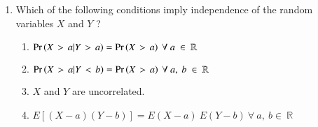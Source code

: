 \begin{enumerate}[label=\thesection.\arabic*.,ref=\thesection.\theenumi]
\item Which of the following conditions imply independence of the random variables $X$
and $Y$ ?
\begin{enumerate}
    \item  $\pr{X\ \mathop{>}\ a|Y\ \mathop{>}\ a} = \pr{X\ \mathop{>}\ a}\ \forall\ a\ \in\ \mathbb{R}$\\ 
    \item  $\pr{X\ \mathop{>}\ a|Y\ \mathop{<}\ b} = \pr{X\ \mathop{>}\ a}\ \forall\ a,\ b\ \in\ \mathbb{R}$\\ 
    \item  $X$ and $Y$ are uncorrelated.\\
    \item  $E[(X-a)(Y-b)] = E(X-a)\ E(Y-b)\ \forall\ a,\ b \in\ \mathbb{R}$\\
\end{enumerate}

\end{enumerate}